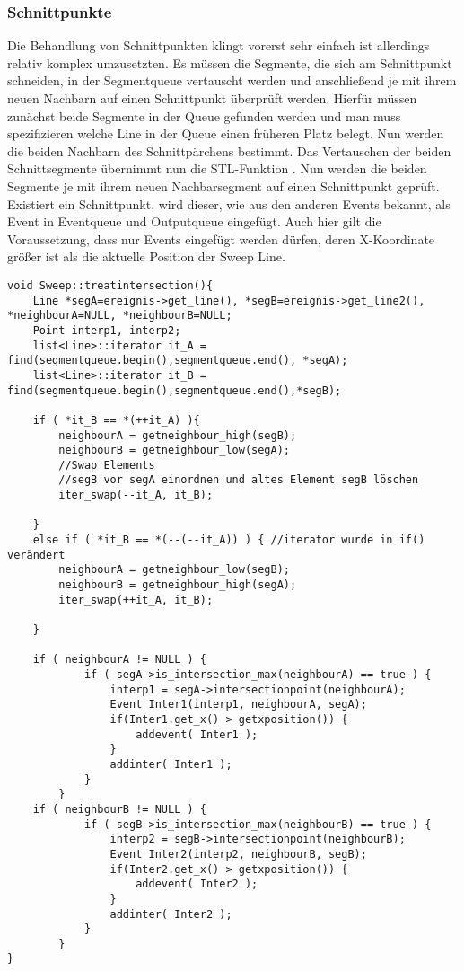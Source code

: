 \subsubsection{Schnittpunkte}
Die Behandlung von Schnittpunkten klingt vorerst sehr einfach ist allerdings relativ komplex umzusetzten. Es müssen die Segmente, die sich am Schnittpunkt schneiden, in der Segmentqueue vertauscht werden und anschließend je mit ihrem neuen Nachbarn auf einen Schnittpunkt überprüft werden. Hierfür müssen zunächst beide Segmente in der Queue gefunden werden und man muss spezifizieren welche Line in der Queue einen früheren Platz belegt. Nun werden die beiden Nachbarn des Schnittpärchens bestimmt. Das Vertauschen der beiden Schnittsegmente übernimmt nun die STL-Funktion . Nun werden die beiden Segmente je mit ihrem neuen Nachbarsegment auf einen Schnittpunkt geprüft. Existiert ein Schnittpunkt, wird dieser, wie aus den anderen Events bekannt, als Event in Eventqueue und Outputqueue eingefügt. Auch hier gilt die Voraussetzung, dass nur Events eingefügt werden dürfen, deren X-Koordinate größer ist als die aktuelle Position der Sweep Line.

\begin{lstlisting}[captionpos=b, caption={Behandlung von Schnittpunkten}, label={A3:BehandlungSchnitt}]
void Sweep::treatintersection(){
	Line *segA=ereignis->get_line(), *segB=ereignis->get_line2(), *neighbourA=NULL, *neighbourB=NULL;
	Point interp1, interp2;
	list<Line>::iterator it_A = find(segmentqueue.begin(),segmentqueue.end(), *segA);
	list<Line>::iterator it_B = find(segmentqueue.begin(),segmentqueue.end(),*segB);

	if ( *it_B == *(++it_A) ){
		neighbourA = getneighbour_high(segB);
		neighbourB = getneighbour_low(segA);
		//Swap Elements
		//segB vor segA einordnen und altes Element segB löschen
		iter_swap(--it_A, it_B);

	}
	else if ( *it_B == *(--(--it_A)) ) { //iterator wurde in if() verändert
		neighbourA = getneighbour_low(segB);
		neighbourB = getneighbour_high(segA);
		iter_swap(++it_A, it_B);

	}

	if ( neighbourA != NULL ) {
			if ( segA->is_intersection_max(neighbourA) == true ) {
				interp1 = segA->intersectionpoint(neighbourA);
				Event Inter1(interp1, neighbourA, segA);
				if(Inter1.get_x() > getxposition()) {
					addevent( Inter1 );
				}
				addinter( Inter1 );
			}
		}
	if ( neighbourB != NULL ) {
			if ( segB->is_intersection_max(neighbourB) == true ) {
				interp2 = segB->intersectionpoint(neighbourB);
				Event Inter2(interp2, neighbourB, segB);
				if(Inter2.get_x() > getxposition()) {
					addevent( Inter2 );
				}
				addinter( Inter2 );
			}
		}
}
\end{lstlisting}




